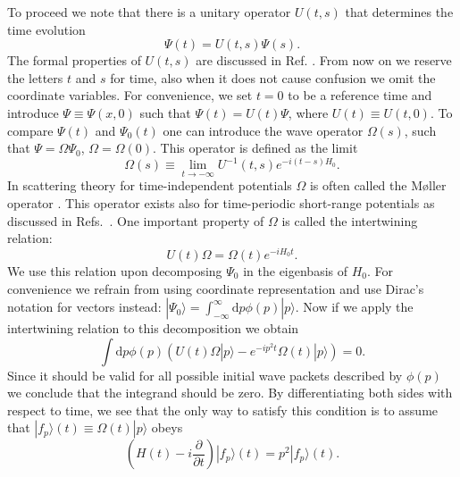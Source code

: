 To proceed we note that there is a unitary operator $U(t,s)$ that determines the time evolution
\begin{equation}
\Psi(t)=U(t,s)\Psi(s).
\end{equation}
The formal properties of $U(t,s)$ are discussed in Ref. \cite{yajima1977}.
From now on we reserve the letters $t$ and $s$ for time, also when it does not cause confusion we omit the coordinate variables. For convenience, we set $t=0$ to be a reference time and introduce $\Psi\equiv\Psi(x,0)$ such that $\Psi(t)=U(t)\Psi$, where $U(t)\equiv U(t,0)$. To compare $\Psi(t)$ and $\Psi_0(t)$ one can introduce the wave operator $\Omega(s)$, such that $\Psi=\Omega \Psi_0$, $\Omega=\Omega(0)$. This operator is defined as the limit
\begin{equation}
\Omega(s) \equiv \lim_{t\to-\infty}U^{-1}(t,s)e^{-i(t-s) H_0}.
\end{equation}
In scattering theory for time-independent potentials $\Omega$ is often called the M{\o}ller operator \cite{taylorbook}. This operator exists also for time-periodic short-range potentials as discussed in Refs.~\cite{yajima1977, howland1979}. One important property of $\Omega$ is called the intertwining relation:
\begin{equation}
U(t)\Omega=\Omega(t)e^{-i H_0 t}.
\end{equation}
We use this relation upon decomposing $\Psi_0$ in the eigenbasis of $H_0$. For convenience we refrain from using coordinate representation and use Dirac's notation for vectors instead: $|\Psi_0\rangle=\int_{-\infty}^{\infty} \mathrm{d}p \phi(p) |p\rangle$. Now if we apply the intertwining relation to this decomposition we obtain
\begin{equation}
\int \mathrm{d}p \phi(p)\left(U(t)\Omega |p\rangle -e^{-i p^2 t}\Omega(t)|p\rangle \right)=0.
\end{equation}
Since it should be valid for all possible initial wave packets described by $\phi(p)$ we  conclude that the integrand should be zero. By differentiating both sides with respect to time, we see that the only way to satisfy this condition is to assume that $|f_p\rangle(t)\equiv \Omega(t)|p\rangle$ obeys
\begin{equation}
\left(H(t)-i\frac{\partial}{\partial t}\right) |f_p\rangle(t) =p^2 |f_p\rangle(t).
\label{eq:floquet}
\end{equation}

